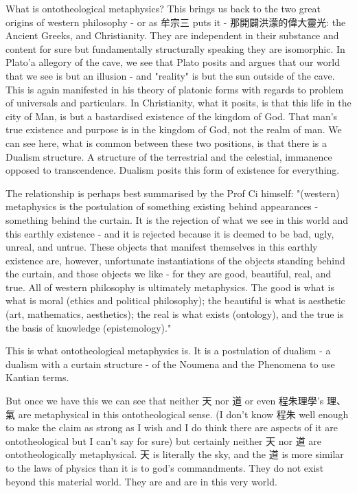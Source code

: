 What is ontotheological metaphysics? This brings us back to the two great origins of western philosophy - or as 牟宗三 puts it - 那開闢洪濛的偉大靈光: the Ancient Greeks, and Christianity. They are independent in their substance and content for sure but fundamentally structurally speaking they are isomorphic. In Plato'a allegory of the cave, we see that Plato posits and argues that our world that we see is but an illusion - and "reality" is but the sun outside of the cave. This is again manifested in his theory of platonic forms with regards to problem of universals and particulars. In Christianity, what it posits, is that this life in the city of Man, is but a bastardised existence of the kingdom of God. That man's true existence and purpose is in the kingdom of God, not the realm of man. We can see here, what is common between these two positions, is that there is a Dualism structure. A structure of the terrestrial and the celestial, immanence opposed to transcendence. Dualism posits this form of existence for everything.

The relationship is perhaps best summarised by the Prof Ci himself: "(western) metaphysics is the postulation of something existing behind appearances - something behind the curtain. It is the rejection of what we see in this world and this earthly existence - and it is rejected because it is deemed to be bad, ugly, unreal, and untrue. These objects that manifest themselves in this earthly existence are, however, unfortunate instantiations of the objects standing behind the curtain, and those objects we like - for they are good, beautiful, real, and true. All of western philosophy is ultimately metaphysics. The good is what is what is moral (ethics and political philosophy); the beautiful is what is aesthetic (art, mathematics, aesthetics); the real is what exists (ontology), and the true is the basis of knowledge (epistemology)." 

This is what ontotheological metaphysics is. It is a postulation of  dualism - a dualism with a curtain structure - of the Noumena and the Phenomena to use Kantian terms. 

But once we have this we can see that neither 天 nor 道 or even 程朱理學's 理、氣 are metaphysical in this ontotheological sense. (I don't know 程朱 well enough to make the claim as strong as I wish and I do think there are aspects of it are ontotheological but I can't say for sure) but certainly neither 天 nor 道 are ontotheologically metaphysical. 天 is literally the sky, and the 道 is more similar to the laws of physics than it is to god's commandments. They do not exist beyond this material world.  They are and are in this very world. 





